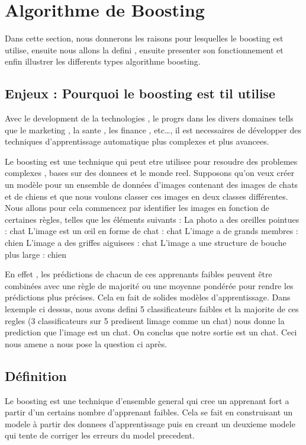 \documentclass[french,a4paper,12pt]{article}
\begin{document}
\section{Algorithme de Boosting}
\quad Dans cette section, nous donnerons les raisons pour lesquelles le boosting est utilise, ensuite nous allons la  defini , ensuite presenter son fonctionnement et enfin illustrer les differents types algorithme boosting.

 \subsection{Enjeux : Pourquoi le boosting est til utilise}

\quad Avec le development de la technologies , le progrs dans les divers domaines tells que le marketing , la sante , les finance , etc…, il est necessaires de développer des techniques d'apprentissage automatique plus complexes et plus avancees. 

\quad Le boosting est une technique qui peut etre utilisee pour resoudre des problemes complexes , bases sur des donnees et le monde reel.
Supposons qu'on veux   créer un modèle pour un ensemble de données d'images contenant des images de chats et de chiens et que nous voulons classer ces images en deux classes différentes. Nous allons pour cela  commencez par identifier les images en fonction de certaines règles, telles que les éléments suivants : 
La photo a des oreilles pointues : chat
L'image est un œil en forme de chat : chat
L'image a de grands membres : chien
L'image a des griffes aiguisees : chat
L'image a une structure de bouche plus large : chien

\quad En effet , les prédictions de chacun de ces apprenants faibles peuvent être combinées avec une règle de majorité ou une moyenne pondérée pour rendre les prédictions plus précises. Cela en fait de solides modèles d'apprentissage.
Dans lexemple ci dessus, nous avons defini 5 classificateurs faibles et  la majorite de ces regles (3 classificateurs sur 5 predisent limage comme un chat) nous donne la prediction que l’image est un chat. On conclus que notre sortie est un chat. Ceci nous amene a nous pose la question ci après.

\subsection{Définition}

 \quad Le boosting est une technique d’ensemble general qui cree un apprenant fort a partir d’un certains nombre d’apprenant faibles. Cela se fait en construisant un modele à partir des donnees d’apprentissage puis en creant un deuxieme modele qui tente de corriger les erreurs du model precedent. 
\end{document}
